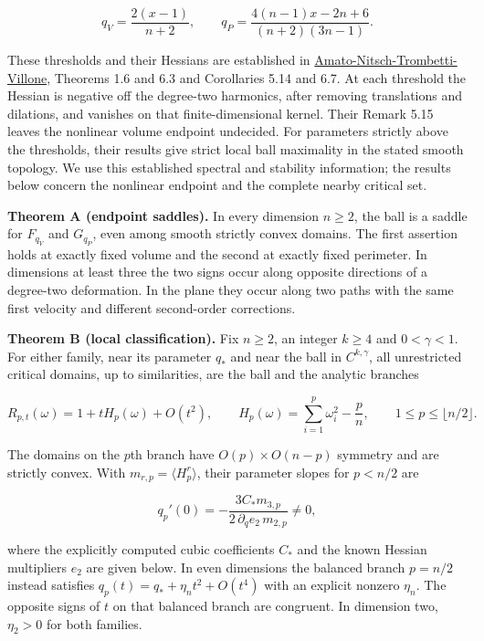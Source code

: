 \documentclass[11pt]{article}
\begin{document}
\[
q_V=\frac{2(x-1)}{n+2},
\qquad q_P=\frac{4(n-1)x-2n+6}{(n+2)(3n-1)}.
\tag{1.2}
\]

These thresholds and their Hessians are established in
\href{https://doi.org/10.1007/s11118-026-10328-2}{Amato-Nitsch-Trombetti-Villone},
Theorems 1.6 and 6.3 and Corollaries 5.14 and 6.7. At each threshold the
Hessian is negative off the degree-two harmonics, after removing
translations and dilations, and vanishes on that finite-dimensional
kernel. Their Remark 5.15 leaves the nonlinear volume endpoint
undecided. For parameters strictly above the thresholds, their results
give strict local ball maximality in the stated smooth topology. We use
this established spectral and stability information; the results below
concern the nonlinear endpoint and the complete nearby critical set.

\textbf{Theorem A (endpoint saddles).} In every dimension \(n\ge2\), the
ball is a saddle for \(F_{q_V}\) and \(G_{q_P}\), even among smooth
strictly convex domains. The first assertion holds at exactly fixed
volume and the second at exactly fixed perimeter. In dimensions at least
three the two signs occur along opposite directions of a degree-two
deformation. In the plane they occur along two paths with the same first
velocity and different second-order corrections.

\textbf{Theorem B (local classification).} Fix \(n\ge2\), an integer
\(k\ge4\) and \(0<\gamma<1\). For either family, near its parameter
\(q_*\) and near the ball in \(C^{k,\gamma}\), all unrestricted critical
domains, up to similarities, are the ball and the analytic branches

\[
R_{p,t}(\omega)=1+tH_p(\omega)+O(t^2),\qquad
H_p(\omega)=\sum_{i=1}^p\omega_i^2-\frac pn,\qquad
1\le p\le\lfloor n/2\rfloor.
\tag{1.3}
\]

The domains on the \(p\)th branch have \(O(p)\times O(n-p)\) symmetry
and are strictly convex. With \(m_{r,p}=\langle H_p^r\rangle\), their
parameter slopes for \(p<n/2\) are

\[
q_p'(0)=-\frac{3C_*m_{3,p}}{2\,\partial_qe_2\,m_{2,p}}\ne0,
\tag{1.4}
\]

where the explicitly computed cubic coefficients \(C_*\) and the known
Hessian multipliers \(e_2\) are given below. In even dimensions the
balanced branch \(p=n/2\) instead satisfies
\(q_p(t)=q_*+\eta_nt^2+O(t^4)\) with an explicit nonzero \(\eta_n\). The
opposite signs of \(t\) on that balanced branch are congruent. In
dimension two, \(\eta_2>0\) for both families.
\end{document}
